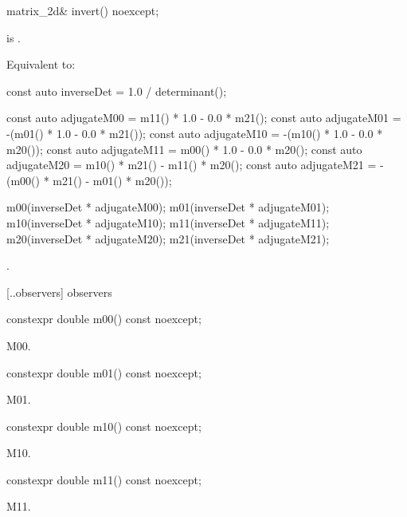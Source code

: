 %
\begin{itemdecl}
matrix_2d& invert() noexcept;
\end{itemdecl}
\begin{itemdescr}
\pnum
\requires
{} is .

\pnum
\effects
Equivalent to:

\begin{codeblock}
const auto inverseDet = 1.0 / determinant();

const auto adjugateM00 =   m11() * 1.0 - 0.0 * m21();
const auto adjugateM01 = -(m01() * 1.0 - 0.0 * m21());
const auto adjugateM10 = -(m10() * 1.0 - 0.0 * m20());
const auto adjugateM11 =   m00() * 1.0 - 0.0 * m20();
const auto adjugateM20 =   m10() * m21() - m11() * m20();
const auto adjugateM21 = -(m00() * m21() - m01() * m20());

m00(inverseDet * adjugateM00);
m01(inverseDet * adjugateM01);
m10(inverseDet * adjugateM10);
m11(inverseDet * adjugateM11);
m20(inverseDet * adjugateM20);
m21(inverseDet * adjugateM21);
\end{codeblock}

\pnum
\returns
{}.
\end{itemdescr}

 [\iotwod.\matrixtwod.observers] { observers}

%
\begin{itemdecl}
constexpr double m00() const noexcept;
\end{itemdecl}
\begin{itemdescr}
\pnum
\returns
M00.
\end{itemdescr}

%
\begin{itemdecl}
constexpr double m01() const noexcept;
\end{itemdecl}
\begin{itemdescr}
\pnum
\returns
M01.
\end{itemdescr}

%
\begin{itemdecl}
constexpr double m10() const noexcept;
\end{itemdecl}
\begin{itemdescr}
\pnum
\returns
M10.
\end{itemdescr}

%
\begin{itemdecl}
constexpr double m11() const noexcept;
\end{itemdecl}
\begin{itemdescr}
\pnum
\returns
M11.
\end{itemdescr}

